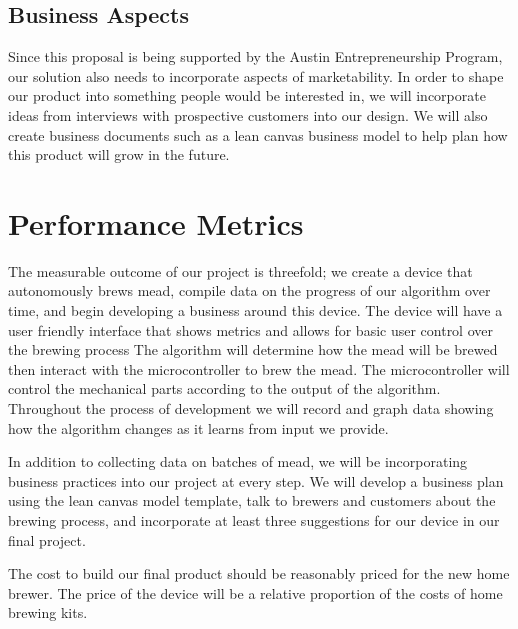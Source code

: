 \documentclass[letterpaper,10pt]{article}
\begin{document}
\subsection{Business Aspects}
Since this proposal is being supported by the Austin Entrepreneurship Program, our 
solution also needs to incorporate aspects of marketability. In order to shape our 
product into something people would be interested in, we will incorporate ideas 
from interviews with prospective customers into our design. We will also create 
business documents such as a lean canvas business model to help plan how this product 
will grow in the future.
\section{Performance Metrics}
The measurable outcome of our project is threefold; we create a device that 
autonomously brews mead, compile data on the progress of our algorithm 
over time, and begin developing a business around this device. 
The device will have a user friendly interface that shows metrics and allows
for basic user control over the brewing process The algorithm will determine
how the mead will be brewed then interact with the microcontroller to brew 
the mead. The microcontroller will control the mechanical parts according to
the output of the algorithm. Throughout the process of development we 
will record and graph data showing how the algorithm changes as it learns 
from input we provide. 

In addition to collecting data on batches of mead, we will be 
incorporating business practices into our project at every step. We will 
develop a business plan using the lean canvas model template, talk to 
brewers and customers about the brewing process, and incorporate at least 
three suggestions for our device in our final project.

The cost to build our final product should be reasonably priced for the new home brewer. 
The price of the device will be a relative proportion of the costs of home brewing kits.
\end{document}
